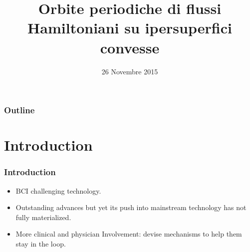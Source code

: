 \documentclass[slidescentered]{beamer}
\title{Orbite periodiche di flussi Hamiltoniani su ipersuperfici convesse}
\author[Michele Gorini]{%
\usebox{\authbox}
}
\institute[Unimib]{Università degli studi di Milano-Bicocca}
\date{26 Novembre 2015}
\begin{document}
\begin{frame}
\titlepage
\end{frame}

    \begin{frame}
        \frametitle{Outline}
        \tableofcontents{}
    \end{frame}
    
    
    \section{Introduction}
    \begin{frame}
        \frametitle{Introduction}
        \begin{center}
            \begin{itemize}
                \item BCI challenging technology.
                \item Outstanding advances but yet its push into mainstream technology has not fully materialized.
                \item More clinical and physician Involvement: devise mechanisms to help them stay in the loop.
            \end{itemize}
        \end{center}
    \end{frame}
\end{document}
